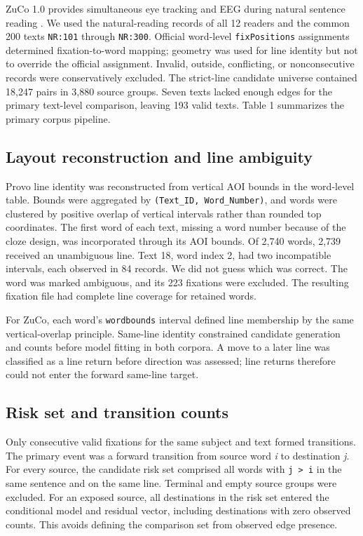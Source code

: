\documentclass[11pt]{article}
\begin{document}
ZuCo 1.0 provides simultaneous eye tracking and EEG during natural sentence reading \citep{hollenstein2018zuco}. We used the natural-reading records of all 12 readers and the common 200 texts \texttt{NR:101} through \texttt{NR:300}. Official word-level \texttt{fixPositions} assignments determined fixation-to-word mapping; geometry was used for line identity but not to override the official assignment. Invalid, outside, conflicting, or nonconsecutive records were conservatively excluded. The strict-line candidate universe contained 18,247 pairs in 3,880 source groups. Seven texts lacked enough edges for the primary text-level comparison, leaving 193 valid texts. Table 1 summarizes the primary corpus pipeline.



\subsection{Layout reconstruction and line ambiguity}

Provo line identity was reconstructed from vertical AOI bounds in the word-level table. Bounds were aggregated by \texttt{(Text\_ID, Word\_Number)}, and words were clustered by positive overlap of vertical intervals rather than rounded top coordinates. The first word of each text, missing a word number because of the cloze design, was incorporated through its AOI bounds. Of 2,740 words, 2,739 received an unambiguous line. Text 18, word index 2, had two incompatible intervals, each observed in 84 records. We did not guess which was correct. The word was marked ambiguous, and its 223 fixations were excluded. The resulting fixation file had complete line coverage for retained words.

For ZuCo, each word's \texttt{wordbounds} interval defined line membership by the same vertical-overlap principle. Same-line identity constrained candidate generation and counts before model fitting in both corpora. A move to a later line was classified as a line return before direction was assessed; line returns therefore could not enter the forward same-line target.

\subsection{Risk set and transition counts}

Only consecutive valid fixations for the same subject and text formed transitions. The primary event was a forward transition from source word \emph{i} to destination \emph{j}. For every source, the candidate risk set comprised all words with \texttt{j > i} in the same sentence and on the same line. Terminal and empty source groups were excluded. For an exposed source, all destinations in the risk set entered the conditional model and residual vector, including destinations with zero observed counts. This avoids defining the comparison set from observed edge presence.
\end{document}
